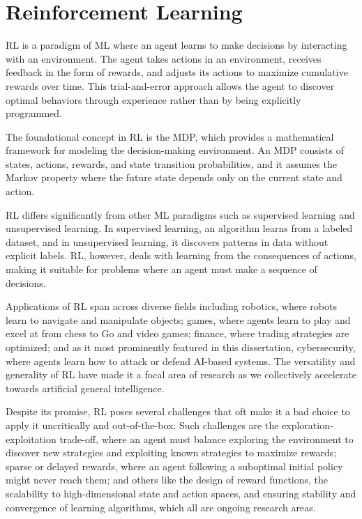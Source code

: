 \section{Reinforcement Learning}

\gls{RL} is a paradigm of \gls{ML} where an agent learns to make decisions by interacting with an environment.
The agent takes actions in an environment, receives feedback in the form of rewards, and adjusts its actions to maximize cumulative rewards over time.
This trial-and-error approach allows the agent to discover optimal behaviors through experience rather than by being explicitly programmed.

The foundational concept in \gls{RL} is the \gls{MDP}, which provides a mathematical framework for modeling the decision-making environment.
An MDP consists of states, actions, rewards, and state transition probabilities, and it assumes the Markov property where the future state depends only on the current state and action.

\gls{RL} differs significantly from other \gls{ML} paradigms such as supervised learning and unsupervised learning.
In supervised learning, an algorithm learns from a labeled dataset, and in unsupervised learning, it discovers patterns in data without explicit labels.
\gls{RL}, however, deals with learning from the consequences of actions, making it suitable for problems where an agent must make a sequence of decisions.

Applications of \gls{RL} span across diverse fields including robotics, where robots learn to navigate and manipulate objects; games, where agents learn to play and excel at from chess to Go and video games; finance, where trading strategies are optimized; and as it most prominently featured in this dissertation, cybersecurity, where agents learn how to attack or defend AI-based systems.
The versatility and generality of \gls{RL} have made it a focal area of research as we collectively accelerate towards artificial general intelligence.

Despite its promise, \gls{RL} poses several challenges that oft make it a bad choice to apply it uncritically and out-of-the-box.
Such challenges are the exploration-exploitation trade-off, where an agent must balance exploring the environment to discover new strategies and exploiting known strategies to maximize rewards; sparse or delayed rewards, where an agent following a suboptimal initial policy might never reach them; and others like the design of reward functions, the scalability to high-dimensional state and action spaces, and ensuring stability and convergence of learning algorithms, which all are ongoing research areas.

